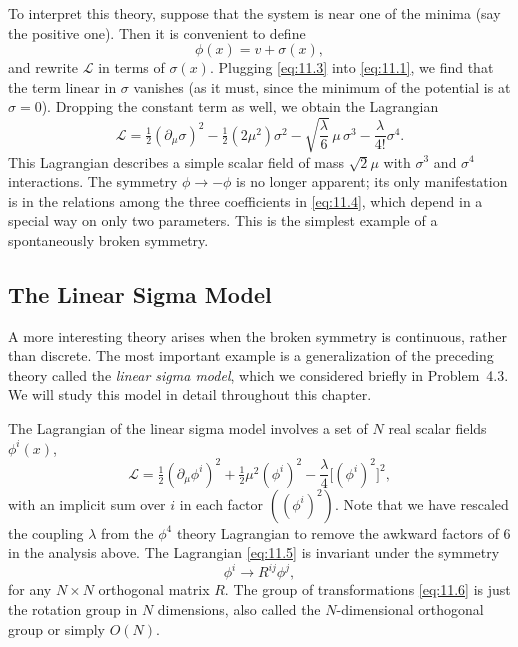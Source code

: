 To interpret this theory, suppose that the system is near one of the minima
(say the positive one).  Then it is convenient to define
\begin{equation}
  \phi(x) = v + \sigma(x),
  \label{eq:11.3}
\end{equation}
and rewrite $\mathcal{L}$ in terms of $\sigma(x)$.  Plugging \eqref{eq:11.3}
into \eqref{eq:11.1}, we find that the term linear in $\sigma$ vanishes (as it
must, since the minimum of the potential is at $\sigma = 0$).  Dropping the
constant term as well, we obtain the Lagrangian
\begin{equation}
  \mathcal{L} = \tfrac{1}{2}(\partial_\mu\sigma)^2
    - \tfrac{1}{2}(2\mu^2)\sigma^2 - \sqrt{\frac{\lambda}{6}}\,\mu\,\sigma^3
    - \frac{\lambda}{4!}\sigma^4 .
  \label{eq:11.4}
\end{equation}
This Lagrangian describes a simple scalar field of mass $\sqrt{2}\mu$ with
$\sigma^3$ and $\sigma^4$ interactions.  The symmetry $\phi\to-\phi$ is no
longer apparent; its only manifestation is in the relations among the three
coefficients in \eqref{eq:11.4}, which depend in a special way on only two
parameters.  This is the simplest example of a spontaneously broken symmetry.

\subsection{The Linear Sigma Model}

A more interesting theory arises when the broken symmetry is continuous,
rather than discrete.  The most important example is a generalization of the
preceding theory called the \emph{linear sigma model}, which we considered
briefly in Problem~4.3.  We will study this model in detail throughout this
chapter.

The Lagrangian of the linear sigma model involves a set of $N$ real scalar
fields $\phi^i(x)$,
\begin{equation}
  \mathcal{L} = \tfrac{1}{2}(\partial_\mu\phi^i)^2 + \tfrac{1}{2}\mu^2(\phi^i)^2
    - \frac{\lambda}{4}\bigl[ (\phi^i)^2 \bigr]^2 ,
  \label{eq:11.5}
\end{equation}
with an implicit sum over $i$ in each factor $((\phi^i)^2)$.  Note that we
have rescaled the coupling $\lambda$ from the $\phi^4$ theory Lagrangian to
remove the awkward factors of 6 in the analysis above.  The Lagrangian
\eqref{eq:11.5} is invariant under the symmetry
\begin{equation}
  \phi^i \to R^{ij}\phi^j ,
  \label{eq:11.6}
\end{equation}
for any $N\times N$ orthogonal matrix $R$.  The group of transformations
\eqref{eq:11.6} is just the rotation group in $N$ dimensions, also called the
$N$-dimensional orthogonal group or simply $O(N)$.

